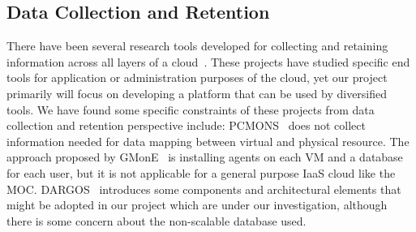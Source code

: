 \subsection{Data Collection and Retention}



There have been several research tools developed for collecting and retaining information across all layers of a cloud~\cite{chaves2011toward,montes2013gmone,povedano2013dargos,alcaraz2015monpaas}. These projects have studied specific end tools for application or administration purposes of the cloud, yet our project primarily will focus on developing a platform that can be used by diversified tools. We have found some specific constraints of these projects from data collection and retention perspective include: PCMONS~\cite{chaves2011toward} does not collect information needed for data mapping between virtual and physical resource. The approach proposed by GMonE~\cite{montes2013gmone} is installing agents on each VM and a database for each user, but it is not applicable for a general purpose IaaS cloud like the MOC. DARGOS~\cite{povedano2013dargos} introduces some components and architectural elements that might be adopted in our project which are under our investigation, although there is some concern about the non-scalable database used. 

